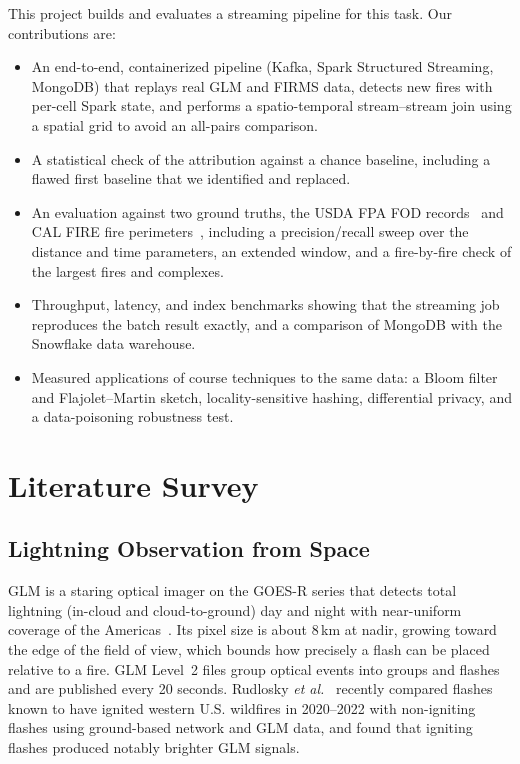 \documentclass[10pt,journal,compsoc]{IEEEtran}
\begin{document}
This project builds and evaluates a streaming pipeline for this task. Our contributions are:
\begin{itemize}
\item An end-to-end, containerized pipeline (Kafka, Spark Structured Streaming, MongoDB) that replays real GLM and FIRMS data, detects new fires with per-cell Spark state, and performs a spatio-temporal stream--stream join using a spatial grid to avoid an all-pairs comparison.
\item A statistical check of the attribution against a chance baseline, including a flawed first baseline that we identified and replaced.
\item An evaluation against two ground truths, the USDA FPA FOD records~\cite{short2022fpafod} and CAL FIRE fire perimeters~\cite{calfire2020perimeters}, including a precision/recall sweep over the distance and time parameters, an extended window, and a fire-by-fire check of the largest fires and complexes.
\item Throughput, latency, and index benchmarks showing that the streaming job reproduces the batch result exactly, and a comparison of MongoDB with the Snowflake data warehouse.
\item Measured applications of course techniques to the same data: a Bloom filter and Flajolet--Martin sketch, locality-sensitive hashing, differential privacy, and a data-poisoning robustness test.
\end{itemize}

\section{Literature Survey}

\subsection{Lightning Observation from Space}
GLM is a staring optical imager on the GOES-R series that detects total lightning (in-cloud and cloud-to-ground) day and night with near-uniform coverage of the Americas~\cite{goodman2013glm}. Its pixel size is about 8\,km at nadir, growing toward the edge of the field of view, which bounds how precisely a flash can be placed relative to a fire. GLM Level~2 files group optical events into groups and flashes and are published every 20 seconds. Rudlosky \textit{et al.}~\cite{rudlosky2025lightningfire} recently compared flashes known to have ignited western U.S. wildfires in 2020--2022 with non-igniting flashes using ground-based network and GLM data, and found that igniting flashes produced notably brighter GLM signals.
\end{document}
